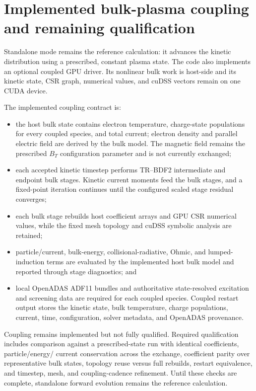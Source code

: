 \documentclass[11pt]{article}
\begin{document}
\section{Implemented bulk-plasma coupling and remaining qualification}
\label{sec:bulk_coupling}

Standalone mode remains the reference calculation: it advances the kinetic distribution
using a prescribed, constant plasma state.  The code also implements an optional coupled
GPU driver.  Its nonlinear bulk work is host-side and its kinetic state, CSR graph,
numerical values, and cuDSS vectors remain on one CUDA device.

The implemented coupling contract is:
\begin{itemize}
  \item the host bulk state contains electron temperature, charge-state populations for
        every coupled species, and total current; electron density and parallel electric
        field are derived by the bulk model.  The magnetic field remains the prescribed
        $B_T$ configuration parameter and is not currently exchanged;
  \item each accepted kinetic timestep performs TR--BDF2 intermediate and endpoint
        bulk stages.  Kinetic current moments feed the bulk stages, and a fixed-point
        iteration continues until the configured scaled stage residual converges;
  \item each bulk stage rebuilds host coefficient arrays and GPU CSR numerical values,
        while the fixed mesh topology and cuDSS symbolic analysis are retained;
  \item particle/current, bulk-energy, collisional-radiative, Ohmic, and lumped-induction
        terms are evaluated by the implemented host bulk model and reported through
        stage diagnostics; and
  \item local OpenADAS ADF11 bundles and authoritative state-resolved excitation and
        screening data are required for each coupled species.  Coupled restart output
        stores the kinetic state, bulk temperature, charge populations, current, time,
        configuration, solver metadata, and OpenADAS provenance.
\end{itemize}

Coupling remains implemented but not fully qualified.  Required qualification includes
comparison against a prescribed-state run with identical coefficients, particle/energy/
current conservation across the exchange, coefficient parity over representative bulk
states, topology reuse versus full rebuilds, restart equivalence, and timestep, mesh, and
coupling-cadence refinement.  Until these checks are complete, standalone forward
evolution remains the reference calculation.
\end{document}
